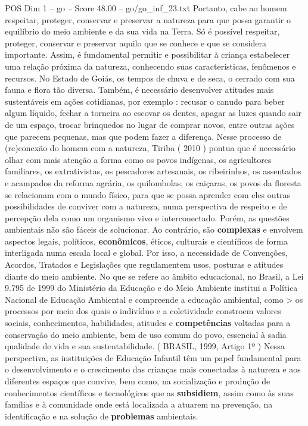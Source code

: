 \begin{textsample}{POS Dim 1 – go – Score 48.00 – go/go\_inf\_23.txt}
Portanto, cabe ao homem respeitar, proteger, conservar e preservar a natureza para que possa garantir o equilíbrio do meio ambiente e da sua vida na Terra.
Só é possível respeitar, proteger, conservar e preservar aquilo que se conhece e que se considera importante.
Assim, é fundamental permitir e possibilitar à criança estabelecer uma relação próxima da natureza, conhecendo suas características, fenômenos e recursos.
No Estado de Goiás, os tempos de chuva e de seca, o cerrado com sua fauna e flora tão diversa.
Também, é necessário desenvolver atitudes mais sustentáveis em ações cotidianas, por exemplo : recusar o canudo para beber algum líquido, fechar a torneira ao escovar os dentes, apagar as luzes quando sair de um espaço, trocar brinquedos no lugar de comprar novos, entre outras ações que parecem pequenas, mas que podem fazer a diferença.
Nesse processo de (re)conexão do homem com a natureza, Tiriba ( 2010 ) pontua que é necessário olhar com mais atenção a forma como os povos indígenas, os agricultores familiares, os extrativistas, os pescadores artesanais, os ribeirinhos, os assentados e acampados da reforma agrária, os quilombolas, os caiçaras, os povos da floresta se relacionam com o mundo físico, para que se possa aprender com eles outras possibilidades de conviver com a natureza, numa perspectiva de respeito e de percepção dela como um organismo vivo e interconectado.
Porém, as questões ambientais não são fáceis de solucionar.
Ao contrário, são \textbf{complexas} e envolvem aspectos legais, políticos, \textbf{econômicos}, éticos, culturais e científicos de forma interligada numa escala local e global.
Por isso, a necessidade de Convenções, Acordos, Tratados e Legislações que regulamentem usos, posturas e atitudes diante do meio ambiente.
No que se refere ao âmbito educacional, no Brasil, a Lei 9.795 de 1999 do Ministério da Educação e do Meio Ambiente institui a Política Nacional de Educação Ambiental e compreende a educação ambiental, como > os processos por meio dos quais o indivíduo e a coletividade constroem valores sociais, conhecimentos, habilidades, atitudes e \textbf{competências} voltadas para a conservação do meio ambiente, bem de uso comum do povo, essencial à sadia qualidade de vida e sua sustentabilidade. ( BRASIL, 1999, Artigo 1º ) Nessa perspectiva, as instituições de Educação Infantil têm um papel fundamental para o desenvolvimento e o crescimento das crianças mais conectadas à natureza e aos diferentes espaços que convive, bem como, na socialização e produção de conhecimentos científicos e tecnológicos que as \textbf{subsidiem}, assim como às suas famílias e à comunidade onde está localizada a atuarem na prevenção, na identificação e na solução de \textbf{problemas} ambientais.

\end{textsample}

